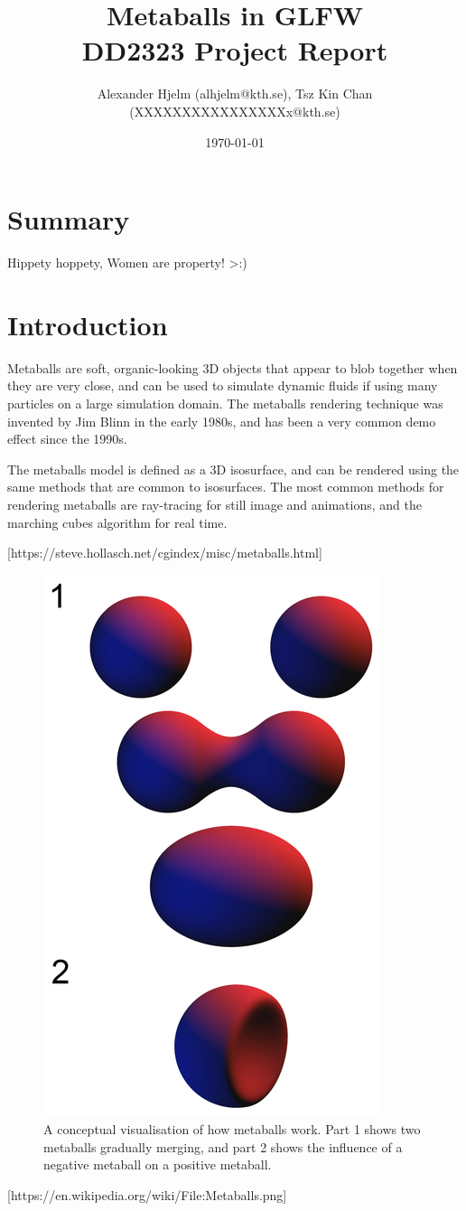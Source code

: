 \documentclass{article}
\begin{document}
    \title{%
      Metaballs in GLFW \\
      \large DD2323 Project Report \\}

    \author{Alexander Hjelm (alhjelm@kth.se), Tsz Kin Chan (XXXXXXXXXXXXXXXXx@kth.se)}

    \date{\today}

    \maketitle

    \section{Summary}
    Hippety hoppety, Women are property! >:)
    
    \section{Introduction}
    
    Metaballs are soft, organic-looking 3D objects that appear to blob together when they are very close, and can be used to simulate dynamic fluids if using many particles on a large simulation domain. 
    The metaballs rendering technique was invented by Jim Blinn in the early 1980s, and has been a very common demo effect since the 1990s.

    The metaballs model is defined as a 3D isosurface, and can be rendered using the same methods that are common to isosurfaces.
    The most common methods for rendering metaballs are ray-tracing for still image and animations, and the marching cubes algorithm for real time.

    [https://steve.hollasch.net/cgindex/misc/metaballs.html]

    \begin{figure}[H]
        \begin{center}
        \includegraphics[width=0.4\linewidth]{img/metaballs-concept.png}
        \caption{A conceptual visualisation of how metaballs work. Part 1 shows two metaballs gradually merging, and part 2 shows the influence of a negative metaball on a positive metaball.}
        \label{fig:metaballs-concept}
        \end{center}
    \end{figure}
    [https://en.wikipedia.org/wiki/File:Metaballs.png]
\end{document}
